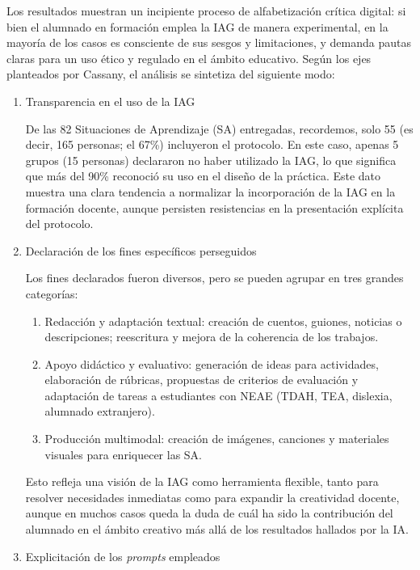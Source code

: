 \documentclass[spanish]{textolivre}
\begin{document}
Los resultados muestran un incipiente proceso de alfabetización crítica digital: si bien el alumnado en formación emplea la IAG de manera experimental, en la mayoría de los casos es consciente de sus sesgos y limitaciones, y demanda pautas claras para un uso ético y regulado en el ámbito educativo. Según los ejes planteados por Cassany, el análisis se sintetiza del siguiente modo:

\begin{enumerate}
    \item Transparencia en el uso de la IAG
    
    De las 82 Situaciones de Aprendizaje (SA) entregadas, recordemos, solo 55 (es decir, 165 personas; el 67\%) incluyeron el protocolo. En este caso, apenas 5 grupos (15 personas) declararon no haber utilizado la IAG, lo que significa que más del 90\% reconoció su uso en el diseño de la práctica. Este dato muestra una clara tendencia a normalizar la incorporación de la IAG en la formación docente, aunque persisten resistencias en la presentación explícita del protocolo.

    \item Declaración de los fines específicos perseguidos

    Los fines declarados fueron diversos, pero se pueden agrupar en tres grandes categorías:

    \begin{enumerate}
    \item Redacción y adaptación textual: creación de cuentos, guiones, noticias o descripciones; reescritura y mejora de la coherencia de los trabajos.
    \item Apoyo didáctico y evaluativo: generación de ideas para actividades, elaboración de rúbricas, propuestas de criterios de evaluación y adaptación de tareas a estudiantes con NEAE (TDAH, TEA, dislexia, alumnado extranjero).
    \item Producción multimodal: creación de imágenes, canciones y materiales visuales para enriquecer las SA.
    \end{enumerate}

    Esto refleja una visión de la IAG como herramienta flexible, tanto para resolver necesidades inmediatas como para expandir la creatividad docente, aunque en muchos casos queda la duda de cuál ha sido la contribución del alumnado en el ámbito creativo más allá de los resultados hallados por la IA.

    \item Explicitación de los \textit{prompts} empleados


\end{enumerate}
\end{document}
